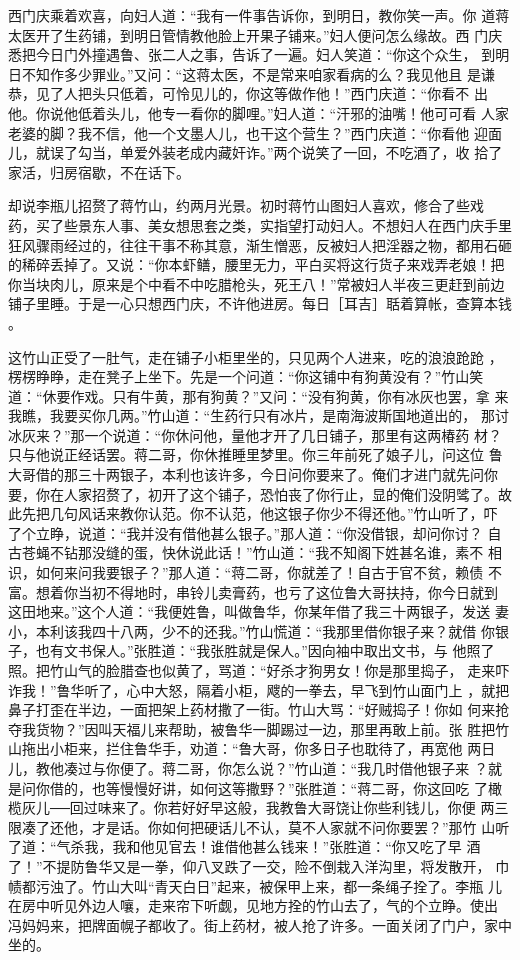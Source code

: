 西门庆乘着欢喜，向妇人道：“我有一件事告诉你，到明日，教你笑一声。你
道蒋太医开了生药铺，到明日管情教他脸上开果子铺来。”妇人便问怎么缘故。西
门庆悉把今日门外撞遇鲁、张二人之事，告诉了一遍。妇人笑道：“你这个众生，
到明日不知作多少罪业。”又问：“这蒋太医，不是常来咱家看病的么？我见他且
是谦恭，见了人把头只低着，可怜见儿的，你这等做作他！”西门庆道：“你看不
出他。你说他低着头儿，他专一看你的脚哩。”妇人道：“汗邪的油嘴！他可可看
人家老婆的脚？我不信，他一个文墨人儿，也干这个营生？”西门庆道：“你看他
迎面儿，就误了勾当，单爱外装老成内藏奸诈。”两个说笑了一回，不吃酒了，收
拾了家活，归房宿歇，不在话下。

却说李瓶儿招赘了蒋竹山，约两月光景。初时蒋竹山图妇人喜欢，修合了些戏
药，买了些景东人事、美女想思套之类，实指望打动妇人。不想妇人在西门庆手里
狂风骤雨经过的，往往干事不称其意，渐生憎恶，反被妇人把淫器之物，都用石砸
的稀碎丢掉了。又说：“你本虾鳝，腰里无力，平白买将这行货子来戏弄老娘！把
你当块肉儿，原来是个中看不中吃腊枪头，死王八！”常被妇人半夜三更赶到前边
铺子里睡。于是一心只想西门庆，不许他进房。每日［耳吉］聒着算帐，查算本钱
。

这竹山正受了一肚气，走在铺子小柜里坐的，只见两个人进来，吃的浪浪跄跄
，楞楞睁睁，走在凳子上坐下。先是一个问道：“你这铺中有狗黄没有？”竹山笑
道：“休要作戏。只有牛黄，那有狗黄？”又问：“没有狗黄，你有冰灰也罢，拿
来我瞧，我要买你几两。”竹山道：“生药行只有冰片，是南海波斯国地道出的，
那讨冰灰来？”那一个说道：“你休问他，量他才开了几日铺子，那里有这两椿药
材？只与他说正经话罢。蒋二哥，你休推睡里梦里。你三年前死了娘子儿，问这位
鲁大哥借的那三十两银子，本利也该许多，今日问你要来了。俺们才进门就先问你
要，你在人家招赘了，初开了这个铺子，恐怕丧了你行止，显的俺们没阴骘了。故
此先把几句风话来教你认范。你不认范，他这银子你少不得还他。”竹山听了，吓
了个立睁，说道：“我并没有借他甚么银子。”那人道：“你没借银，却问你讨？
自古苍蝇不钻那没缝的蛋，快休说此话！”竹山道：“我不知阁下姓甚名谁，素不
相识，如何来问我要银子？”那人道：“蒋二哥，你就差了！自古于官不贫，赖债
不富。想着你当初不得地时，串铃儿卖膏药，也亏了这位鲁大哥扶持，你今日就到
这田地来。”这个人道：“我便姓鲁，叫做鲁华，你某年借了我三十两银子，发送
妻小，本利该我四十八两，少不的还我。”竹山慌道：“我那里借你银子来？就借
你银子，也有文书保人。”张胜道：“我张胜就是保人。”因向袖中取出文书，与
他照了照。把竹山气的脸腊查也似黄了，骂道：“好杀才狗男女！你是那里捣子，
走来吓诈我！”鲁华听了，心中大怒，隔着小柜，飕的一拳去，早飞到竹山面门上
，就把鼻子打歪在半边，一面把架上药材撒了一街。竹山大骂：“好贼捣子！你如
何来抢夺我货物？”因叫天福儿来帮助，被鲁华一脚踢过一边，那里再敢上前。张
胜把竹山拖出小柜来，拦住鲁华手，劝道：“鲁大哥，你多日子也耽待了，再宽他
两日儿，教他凑过与你便了。蒋二哥，你怎么说？”竹山道：“我几时借他银子来
？就是问你借的，也等慢慢好讲，如何这等撒野？”张胜道：“蒋二哥，你这回吃
了橄榄灰儿──回过味来了。你若好好早这般，我教鲁大哥饶让你些利钱儿，你便
两三限凑了还他，才是话。你如何把硬话儿不认，莫不人家就不问你要罢？”那竹
山听了道：“气杀我，我和他见官去！谁借他甚么钱来！”张胜道：“你又吃了早
酒了！”不提防鲁华又是一拳，仰八叉跌了一交，险不倒栽入洋沟里，将发散开，
巾帻都污浊了。竹山大叫“青天白日”起来，被保甲上来，都一条绳子拴了。李瓶
儿在房中听见外边人嚷，走来帘下听觑，见地方拴的竹山去了，气的个立睁。使出
冯妈妈来，把牌面幌子都收了。街上药材，被人抢了许多。一面关闭了门户，家中
坐的。

